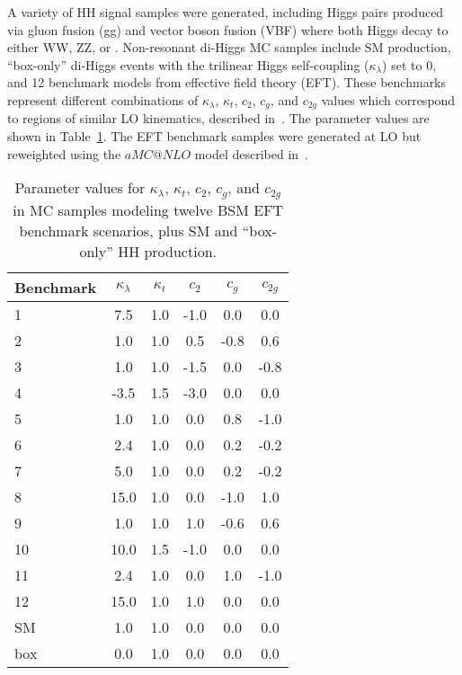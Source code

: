 A variety of HH signal samples were generated, including Higgs pairs produced via gluon
fusion (gg) and vector boson fusion (VBF) where both Higgs decay to either WW, ZZ, or \tautau.
Non-resonant di-Higgs MC samples include SM production, ``box-only'' di-Higgs events with
the trilinear Higgs self-coupling ($\kappa_{\lambda}$) set to 0, and 12 benchmark models
from effective field theory (EFT).  These benchmarks represent different combinations of
$\kappa_{\lambda}$, $\kappa_{t}$, $c_{2}$, $c_{g}$, and $c_{2g}$ values which correspond
to regions of similar LO kinematics, described in~\cite{Xandra:2016hhBM}.  The parameter
values are shown in Table~\ref{tab:HH_benchmarks}.  The EFT benchmark samples were
generated at LO but reweighted using the $aMC@NLO$ model described
in~\cite{Frixione:2011NLOQCD,Alwall:2014dcshh}.

\begin{table}[!h]
\begin{center}
\begin{tabular}{|l|c|c|c|c|c|} \hline
Benchmark & $\kappa_{\lambda}$  & $\kappa_{t}$ & $c_{2}$ & $c_{g}$ &  $c_{2g}$ \\
\hline
1         & 7.5                 & 1.0          & -1.0    & 0.0     & 0.0 \\
2         & 1.0                 & 1.0          &  0.5    & -0.8    & 0.6 \\
3         & 1.0                 & 1.0          & -1.5    & 0.0     & -0.8 \\
4         & -3.5                & 1.5          & -3.0    & 0.0     & 0.0 \\
5         & 1.0                 & 1.0          & 0.0     & 0.8     & -1.0 \\
6         & 2.4                 & 1.0          & 0.0     & 0.2     & -0.2 \\
7         & 5.0                 & 1.0          & 0.0     & 0.2     & -0.2 \\
8         & 15.0                & 1.0          & 0.0     & -1.0    & 1.0 \\
9         & 1.0                 & 1.0          & 1.0     & -0.6    & 0.6 \\
10         & 10.0                & 1.5          & -1.0    & 0.0     & 0.0 \\
11        & 2.4                 & 1.0          & 0.0     & 1.0     & -1.0 \\
12        & 15.0                & 1.0          & 1.0     & 0.0     & 0.0 \\
\hline
SM        & 1.0                 & 1.0          & 0.0     & 0.0     & 0.0 \\
box       & 0.0                 & 1.0          & 0.0     & 0.0     & 0.0 \\
\hline
\end{tabular}
\end{center}
\caption{
  Parameter values for $\kappa_{\lambda}$, $\kappa_{t}$, $c_{2}$, $c_{g}$, and
  $c_{2g}$ in MC samples modeling twelve BSM EFT benchmark scenarios, plus SM
  and ``box-only'' HH production.
}
\label{tab:HH_benchmarks}
\end{table}

